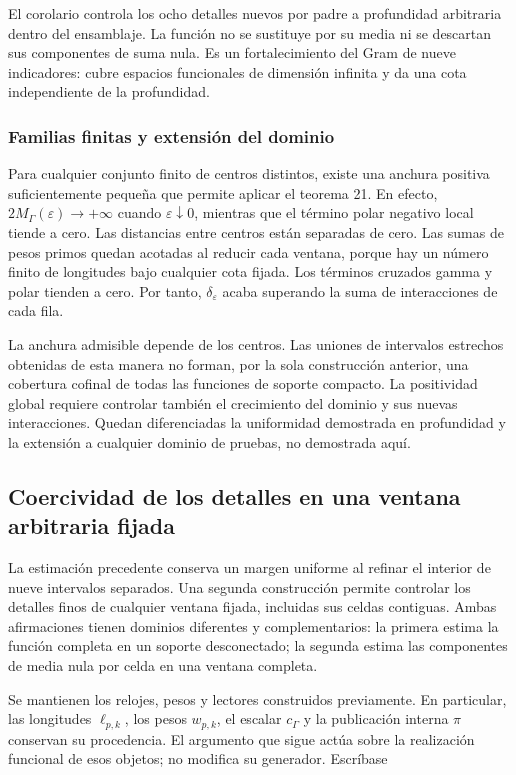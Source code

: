 El corolario controla los ocho detalles nuevos por padre a profundidad arbitraria dentro del ensamblaje. La función no se sustituye por su media ni se descartan sus componentes de suma nula. Es un fortalecimiento del Gram de nueve indicadores: cubre espacios funcionales de dimensión infinita y da una cota independiente de la profundidad.

\subsubsection*{Familias finitas y extensión del dominio}
Para cualquier conjunto finito de centros distintos, existe una anchura positiva suficientemente pequeña que permite aplicar el teorema 21. En efecto, \(2M_\Gamma(\varepsilon)\to+\infty\) cuando \(\varepsilon\downarrow0\), mientras que el término polar negativo local tiende a cero. Las distancias entre centros están separadas de cero. Las sumas de pesos primos quedan acotadas al reducir cada ventana, porque hay un número finito de longitudes bajo cualquier cota fijada. Los términos cruzados gamma y polar tienden a cero. Por tanto, \(\delta_\varepsilon\) acaba superando la suma de interacciones de cada fila.

La anchura admisible depende de los centros. Las uniones de intervalos estrechos obtenidas de esta manera no forman, por la sola construcción anterior, una cobertura cofinal de todas las funciones de soporte compacto. La positividad global requiere controlar también el crecimiento del dominio y sus nuevas interacciones. Quedan diferenciadas la uniformidad demostrada en profundidad y la extensión a cualquier dominio de pruebas, no demostrada aquí.

\subsection{Coercividad de los detalles en una ventana arbitraria fijada}
La estimación precedente conserva un margen uniforme al refinar el interior de nueve intervalos separados. Una segunda construcción permite controlar los detalles finos de cualquier ventana fijada, incluidas sus celdas contiguas. Ambas afirmaciones tienen dominios diferentes y complementarios: la primera estima la función completa en un soporte desconectado; la segunda estima las componentes de media nula por celda en una ventana completa.

Se mantienen los relojes, pesos y lectores construidos previamente. En particular, las longitudes \(\ell_{p,k}\), los pesos \(w_{p,k}\), el escalar \(c_\Gamma\) y la publicación interna \(\pi\) conservan su procedencia. El argumento que sigue actúa sobre la realización funcional de esos objetos; no modifica su generador. Escríbase

